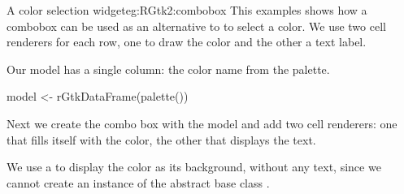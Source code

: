 \begin{example}{A color selection widget}{eg:RGtk2:combobox}
This examples shows how a combobox can be used as an alternative to
 to select a color. We use two cell renderers
for each row, one to draw the color and the other a text label.

Our model has a single column: the color name from the \R\/ palette.
\begin{Schunk}
\begin{Sinput}
 model <- rGtkDataFrame(palette())
\end{Sinput}
\end{Schunk}

Next we create the combo box with the model and add two cell
renderers: one that fills itself with the color, the other that
displays the text.
\begin{Schunk}
\end{Schunk}
%
We use a  to display the color as its
background, without any text, since we cannot create an instance of
the abstract base class .


                






\end{example}
